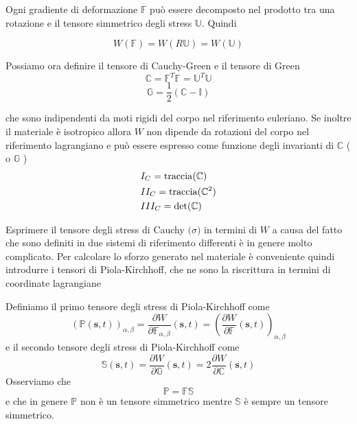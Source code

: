 Ogni gradiente di deformazione $\mathbb{F}$ può essere decomposto nel prodotto tra una rotazione e il tensore simmetrico degli stress $\mathbb{U}$. Quindi

\begin{equation*}
W(\mathbb{F}) = W(R\mathbb{U}) = W(\mathbb{U})
\end{equation*}


Possiamo ora definire il tensore di Cauchy-Green e il tensore di Green
\begin{equation*}
\mathbb{C} = \mathbb{F}^T\mathbb{F} = \mathbb{U}^T\mathbb{U}
\end{equation*}
\begin{equation*}
\mathbb{G} = \frac{1}{2}(\mathbb{C}-\mathbb{I})
\end{equation*}

che sono indipendenti da moti rigidi del corpo nel riferimento euleriano. Se inoltre il materiale è isotropico allora $W$ non dipende da rotazioni del corpo nel riferimento lagrangiano e può essere espresso come funzione degli invarianti di $\mathbb{C}$ ( o $\mathbb{G}$ )
\begin{align*}
&I_C = \operatorname{traccia}(\mathbb{C}) \\
&II_C = \operatorname{traccia}(\mathbb{C}^2) \\
&III_C = \det(\mathbb{C}) \\
\end{align*}

Esprimere il tensore degli stress di Cauchy $\boldsymbol(\sigma)$ in termini di $W$ a causa del fatto che sono definiti in due sistemi di riferimento differenti è in genere molto complicato.
Per calcolare lo sforzo generato nel materiale è conveniente quindi introdurre i tensori di Piola-Kirchhoff, che ne sono la riscrittura in termini di coordinate lagrangiane

Definiamo il primo tensore degli stress di Piola-Kirchhoff come
\begin{equation*}
(\mathbb{P}(\mathbf{s},t))_{\alpha,\beta} = \frac{\partial W}{\partial \mathbb{F}_{\alpha,\beta}} (\mathbf{s},t) =\left( \frac{\partial W}{\partial \mathbb{F}} (\mathbf{s},t)\right)_{\alpha,\beta}
\end{equation*}
e il secondo tensore degli stress di Piola-Kirchhoff come
\begin{equation*}
\mathbb{S}(\mathbf{s},t)=\frac{\partial W}{\partial\mathbb{G}}(\mathbf{s},t)=2\frac{\partial W}{\partial\mathbb{C}}(\mathbf{s},t)
\end{equation*}
Osserviamo che
\begin{equation*}
\mathbb{P}=\mathbb{F}\mathbb{S}
\end{equation*}
e che in genere $\mathbb{P}$ non è un tensore simmetrico mentre $\mathbb{S}$ è sempre un tensore simmetrico.

